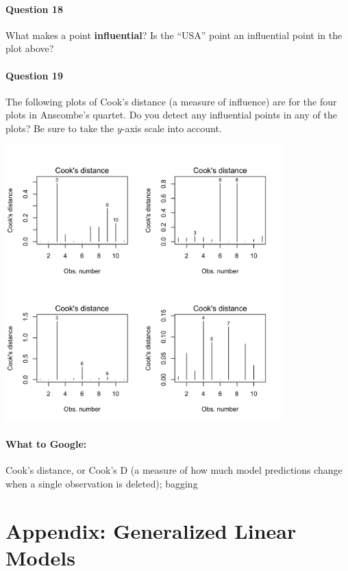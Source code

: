 \paragraph{Question 18} What makes a point \textbf{influential}? Is the ``USA'' point an influential point in the plot above?

\newpage

\paragraph{Question 19} The following plots of Cook's distance (a measure of influence) are for the four plots in Anscombe's quartet. Do you detect any influential points in any of the plots? Be sure to take the $y$-axis scale into account. 
\begin{center}
\includegraphics[width=0.8\textwidth]{img/anscombe-diagnostics-3.png}
\end{center}

\paragraph{What to Google:} Cook's distance, or Cook's D (a measure of how much model predictions change when a single observation is deleted); bagging

\newpage


\section{Appendix: Generalized Linear Models}

